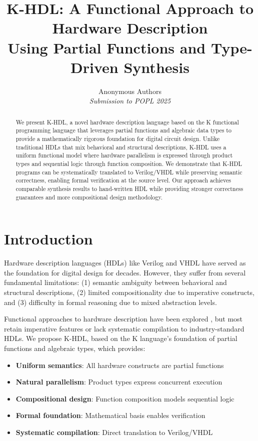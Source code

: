 \documentclass[10pt,twocolumn]{article}
\title{K-HDL: A Functional Approach to Hardware Description\\
Using Partial Functions and Type-Driven Synthesis}
\author{
Anonymous Authors\\
\textit{Submission to POPL 2025}
}
\date{}
\begin{document}
\maketitle

\begin{abstract}
We present K-HDL, a novel hardware description language based on the K functional programming language that leverages partial functions and algebraic data types to provide a mathematically rigorous foundation for digital circuit design. Unlike traditional HDLs that mix behavioral and structural descriptions, K-HDL uses a uniform functional model where hardware parallelism is expressed through product types and sequential logic through function composition. We demonstrate that K-HDL programs can be systematically translated to Verilog/VHDL while preserving semantic correctness, enabling formal verification at the source level. Our approach achieves comparable synthesis results to hand-written HDL while providing stronger correctness guarantees and more compositional design methodology.
\end{abstract}

\section{Introduction}

Hardware description languages (HDLs) like Verilog and VHDL have served as the foundation for digital design for decades. However, they suffer from several fundamental limitations: (1) semantic ambiguity between behavioral and structural descriptions, (2) limited compositionality due to imperative constructs, and (3) difficulty in formal reasoning due to mixed abstraction levels.

Functional approaches to hardware description have been explored \cite{sheeran2005hardware,bjesse1998lava}, but most retain imperative features or lack systematic compilation to industry-standard HDLs. We propose K-HDL, based on the K language's foundation of partial functions and algebraic types, which provides:

\begin{itemize}
\item \textbf{Uniform semantics}: All hardware constructs are partial functions
\item \textbf{Natural parallelism}: Product types express concurrent execution
\item \textbf{Compositional design}: Function composition models sequential logic
\item \textbf{Formal foundation}: Mathematical basis enables verification
\item \textbf{Systematic compilation}: Direct translation to Verilog/VHDL
\end{itemize}
\end{document}

